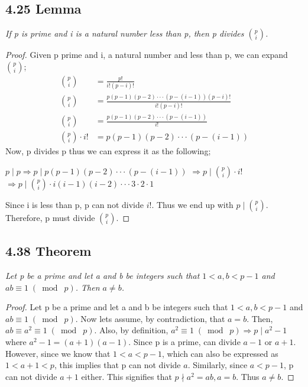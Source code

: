 \documentclass{article}
\begin{document}
\subsection*{4.25 Lemma} 
\quad \textit{If p is prime and i is a natural number less than p, then p divides $\binom{p}{i}$.}

\begin{proof}
Given p prime and i, a natural number and less than p, we can expand $\binom{p}{i}$;
\begin{align*}
    &&\binom{p}{i} &= \frac{p!}{i!(p-i)!}&&\\
    &&\binom{p}{i} &= \frac{p(p-1)(p-2)\cdot\cdot\cdot(p-(i-1))(p-i)!}{i!(p-i)!}&&\\
    &&\binom{p}{i} &= \frac{p(p-1)(p-2)\cdot\cdot\cdot(p-(i-1))}{i!}&&\\
    &&\binom{p}{i}\cdot i! &= p(p-1)(p-2)\cdot\cdot\cdot(p-(i-1))&&
\end{align*}
Now, p divides p thus we can express it as the following;
\begin{center}
    $p \mid p \Longrightarrow p \mid p(p-1)(p-2)\cdot\cdot\cdot(p-(i-1))$
    $\Longrightarrow p \mid \binom{p}{i}\cdot i!$
    $\Longrightarrow p \mid \binom{p}{i}\cdot i(i-1)(i-2)\cdot\cdot\cdot3\cdot2\cdot1$
\end{center}
Since i is less than p, p can not divide $i!$. Thus we end up with $p \mid \binom{p}{i}$. Therefore, p must divide $\binom{p}{i}$.
\end{proof}

\subsection*{4.38 Theorem} 
\quad \textit{Let p be a prime and let a and b be integers such that $1 < a, b < p-1$ and $ab \equiv 1 \;(\bmod\; p)$. Then $a \neq b$.}

\begin{proof}
Let p be a prime and let a and b be integers such that $1 < a, b < p-1$ and $ab \equiv 1 \;(\bmod\; p)$. Now lets assume, by contradiction, that $a = b$. Then, $ab \equiv a^2 \equiv 1 \;(\bmod\; p)$. Also, by definition, $a^2 \equiv 1 \;(\bmod\; p) \Longrightarrow p \mid a^2 -1$ where $a^2-1 = (a+1)(a-1)$. Since p is a prime, can divide $a-1$ or $a+1$.\\
However, since we know that $1 < a < p-1$, which can also be expressed as $1 < a + 1< p$, this implies that p can not divide $a$. Similarly, since $a < p-1$, p can not divide $a+1$ either. This signifies that $p \nmid a^2 = ab, a = b$. Thus $a \neq b$. 
\end{proof}
\end{document}
